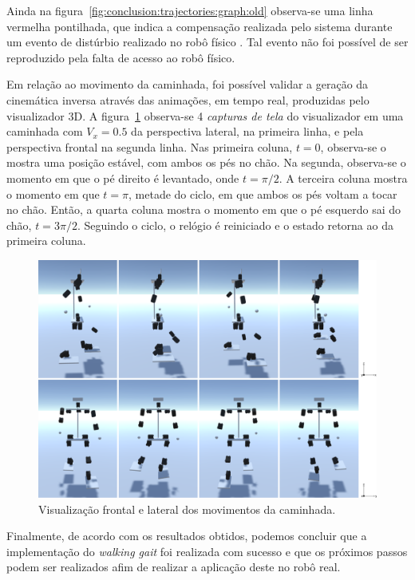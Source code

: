 Ainda na figura~\ref{fig:conclusion:trajectories:graph:old} observa-se uma linha vermelha pontilhada, que indica a compensação realizada pelo sistema durante um evento de distúrbio realizado no robô físico \cite{karimionline}. Tal evento não foi possível de ser reproduzido pela falta de acesso ao robô físico.

Em relação ao movimento da caminhada, foi possível validar a geração da cinemática inversa através das animações, em tempo real, produzidas pelo visualizador 3D. A figura~\ref{fig:conclusion:arash:frames} observa-se 4 \textit{capturas de tela} do visualizador em uma caminhada com $V_x = 0.5$ da perspectiva lateral, na primeira linha, e pela perspectiva frontal na segunda linha. Nas primeira coluna, $t = 0$, observa-se o mostra uma posição estável, com ambos os pés no chão. Na segunda, observa-se o momento em que o pé direito é levantado, onde $t = \pi/2$. A terceira coluna mostra o momento em que $t = \pi$, metade do ciclo, em que ambos os pés voltam a tocar no chão. Então, a quarta coluna mostra o momento em que o pé esquerdo sai do chão, $t = 3\pi/2$. Seguindo o ciclo, o relógio é reiniciado e o estado retorna ao da primeira coluna.

\begin{figure}[htb]
	\centering
	\includegraphics[width=\textwidth]{imagens/svg/conclusion-arash-frames}
	\caption{Visualização frontal e lateral dos movimentos da caminhada.}
	\label{fig:conclusion:arash:frames}
\end{figure}

Finalmente, de acordo com os resultados obtidos, podemos concluir que a implementação do \textit{walking gait} foi realizada com sucesso e que os próximos passos podem ser realizados afim de realizar a aplicação deste no robô real.

